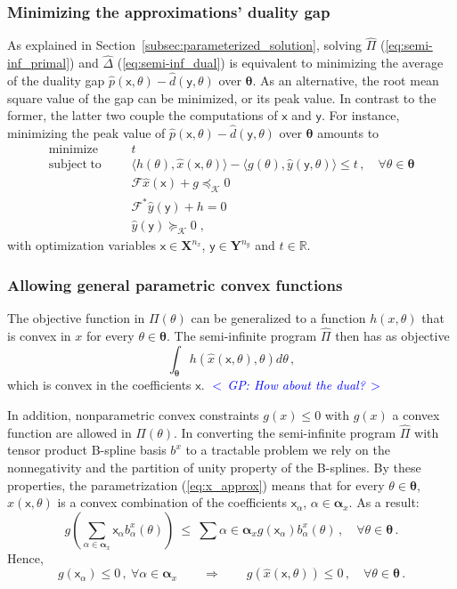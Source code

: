 \documentclass{article}
\DeclareMathOperator*{\minimize}{minimize}
\DeclareMathOperator*{\subj}{subject\;to}
\newcommand{\commentGP}[1]{\noindent \textcolor{blue}{\emph{$<\,$GP: #1$\,>$}}}%
\newcommand{\R}{\mathbb{R}}         %
\newcommand{\ppar}{\theta}                          %
\newcommand{\Ppar}{{\bm{\theta}}}                   %
\newcommand{\X}{\mathbf{X}}                         %
\newcommand{\Y}{\mathbf{Y}}                         %
\newcommand{\calF}{\mathcal{F}}                     %
\newcommand{\Ym}{{\bm{\mathcal{Y}}_{\Ppar}}}        %
\newcommand{\Km}{{\bm{\mathcal{K}}}}                %
\newcommand{\bx}{b^x}               %
\newcommand{\bxa}{\bx_\alpha}       %
\newcommand{\cx}{\textsf{x}}        %
\newcommand{\cxa}{\cx_\alpha}       %
\newcommand{\nx}{{n_x}}             %
\newcommand{\cy}{\textsf{y}}        %
\newcommand{\ny}{{n_y}}             %
\newcommand{\Alpha}{\bm{\alpha}}    %
\begin{document}
\subsubsection{Minimizing the approximations' duality gap}

As explained in Section~\ref{subsec:parameterized_solution}, solving $\hat{\Pi}$ (\ref{eq:semi-inf_primal}) and $\hat{\Delta}$ (\ref{eq:semi-inf_dual}) is equivalent to minimizing the average of the duality gap $\hat{p}(\cx,\ppar)-\hat{d}(\cy,\ppar)$ over $\Ppar$. As an alternative, the root mean square value of the gap can be minimized, or its peak value. In contrast to the former, the latter two couple the computations of $\cx$ and $\cy$. For instance, minimizing the peak value of $\hat{p}(\cx,\ppar)-\hat{d}(\cy,\ppar)$ over $\Ppar$ amounts to
\[ \begin{aligned}
\minimize &&& t \\%
\subj     &&& \langle h(\ppar) , \hat{x}(\cx,\ppar) \rangle - \langle g(\ppar) , \hat{y}(\cy,\ppar) \rangle \leq t\,,\quad\forall\ppar\in\Ppar\\ %
          &&& \calF \hat{x}(\cx) + g \preceq_\Km 0 \\%
          &&& \calF^* \hat{y}(\cy) + h = 0 \\%
          &&& \hat{y}(\cy) \succeq_\Km 0\;,%
\end{aligned}\]
with optimization variables $\cx\in\X^\nx$, $\cy\in\Y^\ny$ and $t\in\R$.


\subsubsection{Allowing general parametric convex functions}

The objective function in $\Pi(\ppar)$ can be generalized to a function $h(x,\ppar)$ that is convex in $x$ for every $\ppar\in\Ppar$. The semi-infinite program $\hat{\Pi}$ then has as objective
\[ \int_{\Ppar} h(\hat{x}(\cx,\ppar), \ppar) d\ppar\,,
\]
which is convex in the coefficients $\cx$. \commentGP{How about the dual?}

In addition, nonparametric convex constraints $g(x)\leq0$ with $g(x)$ a convex function are allowed in $\Pi(\ppar)$. In converting the semi-infinite program $\hat{\Pi}$ with tensor product B-spline basis $\bx$ to a tractable problem we rely on the nonnegativity and the partition of unity property of the B-splines. By these properties, the parametrization (\ref{eq:x_approx}) means that for every $\ppar\in\Ppar$, $\hat{x}(\cx,\ppar)$ is a convex combination of the coefficients $\cxa$, $\alpha\in\Alpha_x$. As a result:
\[ g\left(\sum_{\alpha\in\Alpha_x} \cxa \bxa(\ppar)\right) ~\leq~ \sum{\alpha\in\Alpha_x} g(\cxa) \bxa(\ppar)\,, \quad \forall \ppar\in\Ppar\,. %
\]
Hence,
\[ g(\cxa)\leq 0\,,~\forall \alpha\in\Alpha_x \qquad \Rightarrow \qquad g(\hat{x}(\cx,\ppar))\leq0\,,\quad\forall \ppar\in\Ppar\,.%
\]
\end{document}
